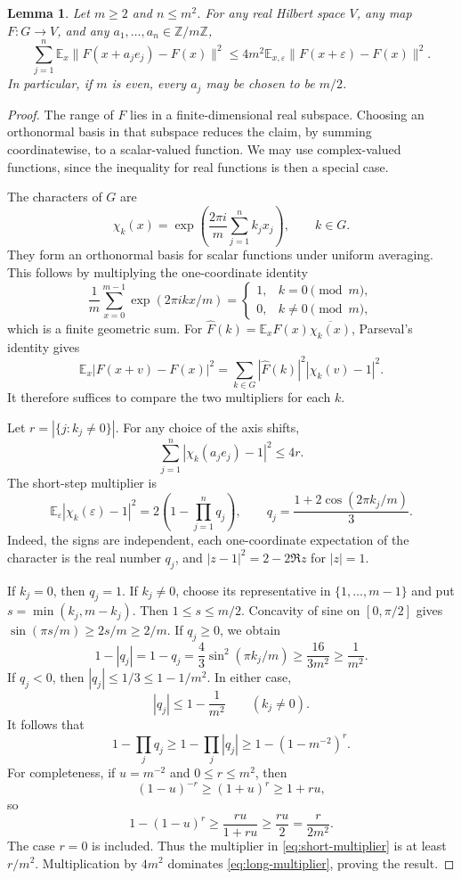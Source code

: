 \documentclass[11pt]{article}
\newtheorem{lemma}[theorem]{Lemma}
\theoremstyle{definition}
\newcommand{\Z}{\mathbb Z}
\newcommand{\E}{\mathbb E}
\begin{document}
\begin{lemma}\label{lem:torus-inequality}
Let $m\ge2$ and $n\le m^2$. For any real Hilbert space $V$, any map
$F:G\to V$, and any $a_1,\ldots,a_n\in\Z/m\Z$,
\begin{equation}\label{eq:torus}
 \sum_{j=1}^n\E_x\|F(x+a_je_j)-F(x)\|^2
 \le4m^2\E_{x,\varepsilon}\|F(x+\varepsilon)-F(x)\|^2.
\end{equation}
In particular, if $m$ is even, every $a_j$ may be chosen to be $m/2$.
\end{lemma}
\begin{proof}
The range of $F$ lies in a finite-dimensional real subspace. Choosing
an orthonormal basis in that subspace reduces the claim, by summing
coordinatewise, to a scalar-valued function. We may use complex-valued
functions, since the inequality for real functions is then a special case.

The characters of $G$ are
\[
 \chi_k(x)=\exp\left(\frac{2\pi i}{m}\sum_{j=1}^nk_jx_j\right),
 \qquad k\in G.
\]
They form an orthonormal basis for scalar functions under uniform
averaging. This follows by multiplying the one-coordinate identity
\[
 \frac1m\sum_{x=0}^{m-1}\exp(2\pi i kx/m)
 =\begin{cases}1,&k=0\pmod m,\\0,&k\ne0\pmod m,\end{cases}
\]
which is a finite geometric sum. For
$\widehat F(k)=\E_xF(x)\overline{\chi_k(x)}$, Parseval's identity gives
\[
 \E_x|F(x+v)-F(x)|^2
 =\sum_{k\in G}|\widehat F(k)|^2|\chi_k(v)-1|^2.
\]
It therefore suffices to compare the two multipliers for each $k$.

Let $r=|\{j:k_j\ne0\}|$. For any choice of the axis shifts,
\begin{equation}\label{eq:long-multiplier}
 \sum_{j=1}^n|\chi_k(a_je_j)-1|^2\le4r.
\end{equation}
The short-step multiplier is
\begin{equation}\label{eq:short-multiplier}
 \E_\varepsilon|\chi_k(\varepsilon)-1|^2
 =2\left(1-\prod_{j=1}^n q_j\right),\qquad
 q_j=\frac{1+2\cos(2\pi k_j/m)}3.
\end{equation}
Indeed, the signs are independent, each one-coordinate expectation of
the character is the real number $q_j$, and $|z-1|^2=2-2\Re z$ for
$|z|=1$.

If $k_j=0$, then $q_j=1$. If $k_j\ne0$, choose its representative
in $\{1,\ldots,m-1\}$ and put
$s=\min(k_j,m-k_j)$. Then $1\le s\le m/2$. Concavity of sine on
$[0,\pi/2]$ gives $\sin(\pi s/m)\ge2s/m\ge2/m$.
If $q_j\ge0$, we obtain
\[
 1-|q_j|=1-q_j=\frac43\sin^2(\pi k_j/m)
 \ge\frac{16}{3m^2}\ge\frac1{m^2}.
\]
If $q_j<0$, then $|q_j|\le1/3\le1-1/m^2$. In either case,
\[
 |q_j|\le1-\frac1{m^2}\qquad(k_j\ne0).
\]
It follows that
\[
 1-\prod_jq_j\ge1-\prod_j|q_j|
 \ge1-(1-m^{-2})^r.
\]
For completeness, if $u=m^{-2}$ and $0\le r\le m^2$, then
\[
 (1-u)^{-r}\ge(1+u)^r\ge1+ru,
\]
so
\[
 1-(1-u)^r\ge\frac{ru}{1+ru}\ge\frac{ru}{2}
 =\frac{r}{2m^2}.
\]
The case $r=0$ is included. Thus the multiplier in
\eqref{eq:short-multiplier} is at least $r/m^2$. Multiplication by
$4m^2$ dominates \eqref{eq:long-multiplier}, proving the result.
\end{proof}
\end{document}
